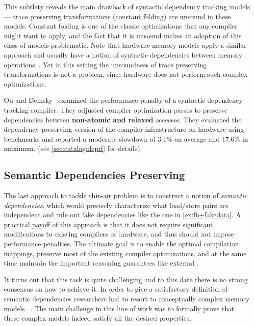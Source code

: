 This subtlety reveals the main drawback of 
syntactic dependency tracking models --- 
trace preserving transformations
(\eg constant folding) are unsound in these models. 
Constant folding is one of the classic optimizations 
that any compiler might want to apply, 
and the fact that it is unsound  
makes an adoption of this class of models problematic.
Note that hardware memory models apply a similar approach 
and usually have a notion of syntactic dependencies between 
memory operations~\cite{Sarkar-al:PLDI11, Alglave-al:TOPLAS14, Pulte-al:POPL18}.
Yet in this setting the unsoundness of 
trace preserving transformations is not a problem,
since hardware does not perform such complex optimizations.

Ou and Demsky~\cite{Ou-Demsky:OOPSLA18} examined
the performance penalty of a syntactic 
dependency tracking compiler.
They adjusted compiler optimization passes to preserve
dependencies between \textbf{non-atomic and relaxed} accesses.
They evaluated the dependency preserving 
version of the \LLVM compiler infrastructure 
on  hardware using \SPECCPU benchmarks
and reported a moderate slowdown of 
3.1\% on average and 17.6\% in maximum. 
(see \ref{sec:catalog:deprf} for details).

\subsection{Semantic Dependencies Preserving}
\label{sec:analysis:sdeprf}

The last approach to tackle thin-air problem is to   
construct a notion of \emph{semantic dependencies}, 
which would precisely characterize what load/store 
pairs are independent and rule out fake dependencies 
like the one in \ref{ex:lb+fakedata}.
A practical payoff of this approach is that it 
does not require significant modifications to existing compilers or hardware, 
and thus should not impose performance penalties.  
The ultimate goal is to enable the optimal compilation mappings, 
preserve most of the existing compiler optimizations, 
and at the same time maintain the important 
reasoning guarantees like external \DRF. 

It turns out that this task is quite challenging 
and to this date there is no strong consensus on how to achieve it.
In order to give a satisfactory definition of semantic dependencies 
researchers had to resort to conceptually complex memory models%
~\cite{Jagadeesan-al:ESOP10, Kang-al:POPL17, Jeffrey-Riely:LICS16, 
PichonPharabod-Sewell:POPL16, Chakraborty-Vafeiadis:POPL19, Paviotti-al:ESOP20}.
The main challenge in this line of work was to formally prove 
that these complex models indeed satisfy all the desired properties. 

